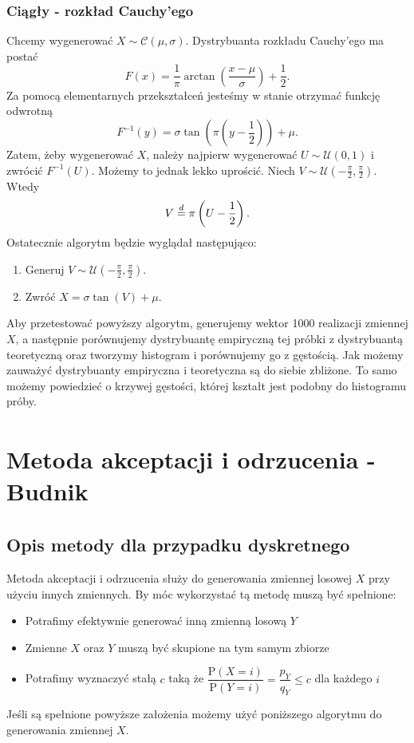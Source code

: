 \documentclass[12pt]{mwrep}
\begin{document}
	\subsubsection{Ciągły - rozkład Cauchy'ego}
	\noindent Chcemy wygenerować $ X \sim \mathcal{C}(\mu, \sigma) $. 
	Dystrybuanta rozkładu Cauchy'ego ma postać
	$$ F(x) = \frac{1}{\pi} \arctan{\left(\frac{x - \mu}{\sigma}\right)} + \frac{1}{2}. $$
	Za pomocą elementarnych przekształceń jesteśmy w stanie otrzymać funkcję odwrotną
	$$ F^{-1}(y) = \sigma \tan \left(\pi \left(y - \frac{1}{2}\right) \right) + \mu. $$
	Zatem, żeby wygenerować $X$, należy najpierw wygenerować $U \sim \mathcal{U}(0, 1) $ i zwrócić $F^{-1}(U)$. Możemy to jednak lekko uprościć. Niech $ V \sim \mathcal{U}\left(-\frac{\pi}{2}, \frac{\pi}{2}\right) $. Wtedy
	$$ V \buildrel{d}\over{=} \pi \left(U - \frac{1}{2}\right). $$
	Ostatecznie algorytm będzie wyglądał następująco:
	\begin{enumerate}[leftmargin=10mm]
		\item Generuj $V \sim \mathcal{U}\left(-\frac{\pi}{2}, \frac{\pi}{2}\right)$.
		\item Zwróć $ X = \sigma \tan(V) + \mu $.
	\end{enumerate}
	Aby przetestować powyższy algorytm, generujemy wektor 1000 realizacji zmiennej $X$, a następnie porównujemy dystrybuantę empiryczną tej próbki z dystrybuantą teoretyczną oraz tworzymy histogram i porównujemy go z gęstością.
	Jak możemy zauważyć dystrybuanty empiryczna i teoretyczna są do siebie zbliżone. To samo możemy powiedzieć o krzywej gęstości, której kształt jest podobny do histogramu próby.



	
	\section{Metoda akceptacji i odrzucenia\textsuperscript{\cite{AO - dyskretny}} - Budnik}
	\subsection{Opis metody dla przypadku dyskretnego\textsuperscript{\cite{AO - dyskretny}}}
	\noindent Metoda akceptacji i odrzucenia służy do generowania zmiennej losowej $X$ przy użyciu innych zmiennych. By móc wykorzystać tą metodę muszą być spełnione:
	\begin{itemize}[leftmargin=10mm]
		\item Potrafimy efektywnie generować inną zmienną losową $Y$
		\item Zmienne $X$ oraz $Y$ muszą być skupione na tym samym zbiorze
		\item Potrafimy wyznaczyć stałą $c$ taką że $\dfrac{\mathrm{P}(X=i)}{\mathrm{P}(Y=i)}=\dfrac{p_Y}{q_Y}\leqslant c$ dla każdego $i$
	\end{itemize}
	Jeśli są spełnione powyższe założenia możemy użyć poniższego algorytmu do generowania zmiennej $X$.
\end{document}
